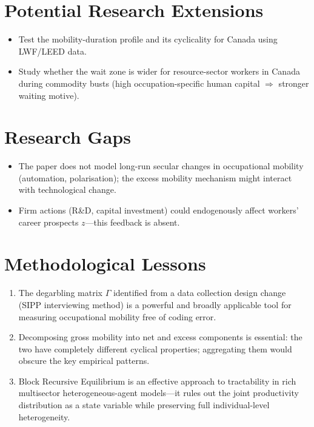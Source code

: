 \section{Potential Research Extensions}

\begin{itemize}
  \item Test the mobility-duration profile and its cyclicality for Canada
    using LWF/LEED data.
  \item Study whether the wait zone is wider for resource-sector workers in
    Canada during commodity busts (high occupation-specific human capital
    $\Rightarrow$ stronger waiting motive).
\end{itemize}

\section{Research Gaps}

\begin{itemize}
  \item The paper does not model long-run secular changes in occupational
    mobility (automation, polarisation); the excess mobility mechanism might
    interact with technological change.
  \item Firm actions (R&D, capital investment) could endogenously affect
    workers' career prospects $z$---this feedback is absent.
\end{itemize}

\section{Methodological Lessons}

\begin{enumerate}
  \item The degarbling matrix $\Gamma$ identified from a data collection
    design change (SIPP interviewing method) is a powerful and broadly
    applicable tool for measuring occupational mobility free of coding error.
  \item Decomposing gross mobility into net and excess components is essential:
    the two have completely different cyclical properties; aggregating them
    would obscure the key empirical patterns.
  \item Block Recursive Equilibrium is an effective approach to tractability
    in rich multisector heterogeneous-agent models---it rules out the joint
    productivity distribution as a state variable while preserving full
    individual-level heterogeneity.
\end{enumerate}

